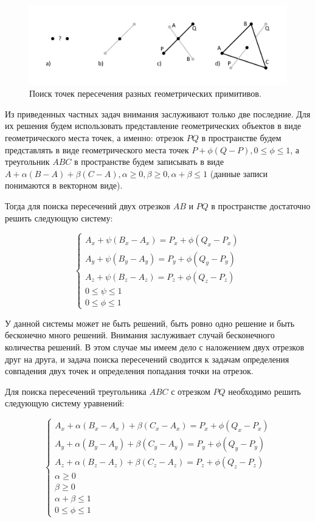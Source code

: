 \documentclass[
11pt,%
tightenlines,%
twoside,%
onecolumn,%
nofloats,%
nobibnotes,%
nofootinbib,%
superscriptaddress,%
noshowpacs,%
centertags]%
{revtex4}
\begin{document}
\begin{figure}[h]
\includegraphics[width=1.0\textwidth]{pics/pic_intersection_s.pdf}
\caption{Поиск точек пересечения разных геометрических примитивов.}\label{fig:pic_intersection_s}
\end{figure}

Из приведенных частных задач внимания заслуживают только две последние.
Для их решения будем использовать представление геометрических объектов в виде геометрического места точек, а именно: отрезок $PQ$ в пространстве будем представлять в виде геометрического места точек $P + \phi(Q - P), 0 \le \phi \le 1$, а треугольник $ABC$ в пространстве будем записывать в виде $A + \alpha(B - A) + \beta(C - A), \alpha \ge 0, \beta \ge 0, \alpha + \beta \le 1$ (данные записи понимаются в векторном виде).

Тогда для поиска пересечений двух отрезков $AB$ и $PQ$ в пространстве достаточно решить следующую систему:

\begin{equation}
\begin{cases}
A_x + \psi(B_x - A_x) = P_x + \phi(Q_x - P_x) \\
A_y + \psi(B_y - A_y) = P_y + \phi(Q_y - P_y) \\
A_z + \psi(B_z - A_z) = P_z + \phi(Q_z - P_z) \\
0 \le \psi \le 1 \\
0 \le \phi \le 1
\end{cases}
\end{equation}

У данной системы может не быть решений, быть ровно одно решение и быть бесконечно много решений.
Внимания заслуживает случай бесконечного количества решений.
В этом случае мы имеем дело с наложением двух отрезков друг на друга, и задача поиска пересечений сводится к задачам определения совпадения двух точек и определения попадания точки на отрезок.

Для поиска пересечений треугольника $ABC$ с отрезком $PQ$ необходимо решить следующую систему уравнений:

\begin{equation}
\begin{cases}
A_x + \alpha(B_x - A_x) + \beta(C_x - A_x) = P_x + \phi(Q_x - P_x) \\
A_y + \alpha(B_y - A_y) + \beta(C_y - A_y) = P_y + \phi(Q_y - P_y) \\
A_z + \alpha(B_z - A_z) + \beta(C_z - A_z) = P_z + \phi(Q_z - P_z) \\
\alpha \ge 0 \\
\beta \ge 0 \\
\alpha + \beta \le 1 \\
0 \le \phi \le 1
\end{cases}
\end{equation}
\end{document}
